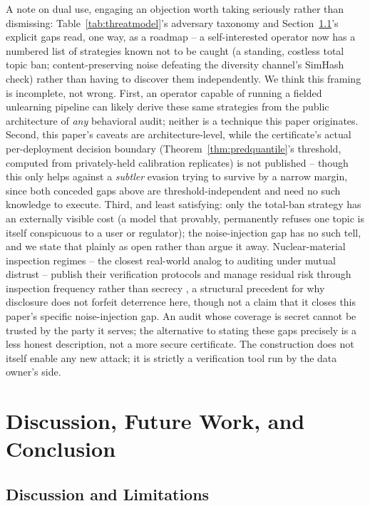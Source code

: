 \documentclass[10pt,journal,compsoc]{IEEEtran}
\begin{document}
A note on dual use, engaging an objection worth taking seriously rather than dismissing: Table~\ref{tab:threatmodel}'s adversary taxonomy and Section~\ref{sec:discussion}'s explicit gaps read, one way, as a roadmap -- a self-interested operator now has a numbered list of strategies known not to be caught (a standing, costless total topic ban; content-preserving noise defeating the diversity channel's SimHash check) rather than having to discover them independently. We think this framing is incomplete, not wrong. First, an operator capable of running a fielded unlearning pipeline can likely derive these same strategies from the public architecture of \emph{any} behavioral audit; neither is a technique this paper originates. Second, this paper's caveats are architecture-level, while the certificate's actual per-deployment decision boundary (Theorem~\ref{thm:predquantile}'s threshold, computed from privately-held calibration replicates) is not published -- though this only helps against a \emph{subtler} evasion trying to survive by a narrow margin, since both conceded gaps above are threshold-independent and need no such knowledge to execute. Third, and least satisfying: only the total-ban strategy has an externally visible cost (a model that provably, permanently refuses one topic is itself conspicuous to a user or regulator); the noise-injection gap has no such tell, and we state that plainly as open rather than argue it away. Nuclear-material inspection regimes -- the closest real-world analog to auditing under mutual distrust -- publish their verification protocols and manage residual risk through inspection frequency rather than secrecy \cite{avenhaus2002inspection}, a structural precedent for why disclosure does not forfeit deterrence here, though not a claim that it closes this paper's specific noise-injection gap. An audit whose coverage is secret cannot be trusted by the party it serves; the alternative to stating these gaps precisely is a less honest description, not a more secure certificate. The construction does not itself enable any new attack; it is strictly a verification tool run by the data owner's side.

\section{Discussion, Future Work, and Conclusion}
\label{sec:discussion-conclusion}

\subsection{Discussion and Limitations}
\label{sec:discussion}
\end{document}

